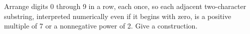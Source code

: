 Arrange digits 0 through 9 in a row, each once, so each adjacent two-character substring, interpreted numerically even if it begins with zero, is a positive multiple of 7 or a nonnegative power of 2. Give a construction.
